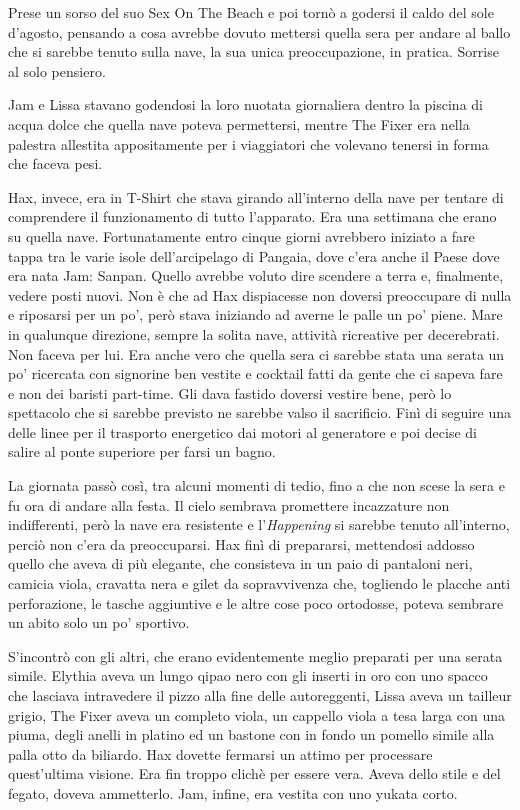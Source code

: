     Prese un sorso del suo Sex On The Beach e poi tornò a godersi il caldo
    del sole d'agosto, pensando a cosa avrebbe dovuto mettersi quella sera
    per andare al ballo che si sarebbe tenuto sulla nave, la sua unica
    preoccupazione, in pratica. Sorrise al solo pensiero.

    Jam e Lissa stavano godendosi la loro nuotata giornaliera dentro la
    piscina di acqua dolce che quella nave poteva permettersi, mentre The
    Fixer era nella palestra allestita appositamente per i viaggiatori che
    volevano tenersi in forma che faceva pesi.

    Hax, invece, era in T-Shirt che stava girando all'interno della nave
    per tentare di comprendere il funzionamento di tutto l'apparato. Era
    una settimana che erano su quella nave. Fortunatamente entro cinque
    giorni avrebbero iniziato a fare tappa tra le varie isole
    dell'arcipelago di Pangaia, dove c'era anche il Paese dove era nata
    Jam: Sanpan. Quello avrebbe voluto dire scendere a terra
    e, finalmente, vedere posti nuovi. Non è che ad Hax dispiacesse non
    doversi preoccupare di nulla e riposarsi per un po', però stava
    iniziando ad averne le palle un po' piene. Mare in qualunque
    direzione, sempre la solita nave, attività ricreative per decerebrati.
    Non faceva per lui. Era anche vero che quella sera ci sarebbe stata una
    serata un po' ricercata con signorine ben vestite e cocktail fatti da
    gente che ci sapeva fare e non dei baristi part-time. Gli dava fastido
    doversi vestire bene, però lo spettacolo che si sarebbe previsto ne
    sarebbe valso il sacrificio. Finì di seguire una delle linee per il
    trasporto energetico dai motori al generatore e poi decise di salire al
    ponte superiore per farsi un bagno.

    La giornata passò così, tra alcuni momenti di tedio, fino a che non
    scese la sera e fu ora di andare alla festa. Il cielo sembrava
    promettere incazzature non indifferenti, però la nave era resistente e
    l'\emph{Happening} si sarebbe tenuto all'interno, perciò non c'era da
    preoccuparsi. Hax finì di prepararsi, mettendosi addosso quello che
    aveva di più elegante, che consisteva in un paio di pantaloni neri,
    camicia viola, cravatta nera e gilet da sopravvivenza che, togliendo le
    placche anti perforazione, le tasche aggiuntive e le altre cose poco
    ortodosse, poteva sembrare un abito solo un po' sportivo.

    S'incontrò con gli altri, che erano evidentemente meglio preparati per
    una serata simile. Elythia aveva un lungo qipao nero con gli inserti in
    oro con uno spacco che lasciava intravedere il pizzo alla fine delle
    autoreggenti, Lissa aveva un tailleur grigio, The Fixer aveva un
    completo viola, un cappello viola a tesa larga con una piuma, degli
    anelli in platino ed un bastone con in fondo un pomello simile alla
    palla otto da biliardo. Hax dovette fermarsi un attimo per processare
    quest'ultima visione. Era fin troppo clichè per essere vera. Aveva
    dello stile e del fegato, doveva ammetterlo. Jam, infine, era vestita
    con uno yukata corto.

